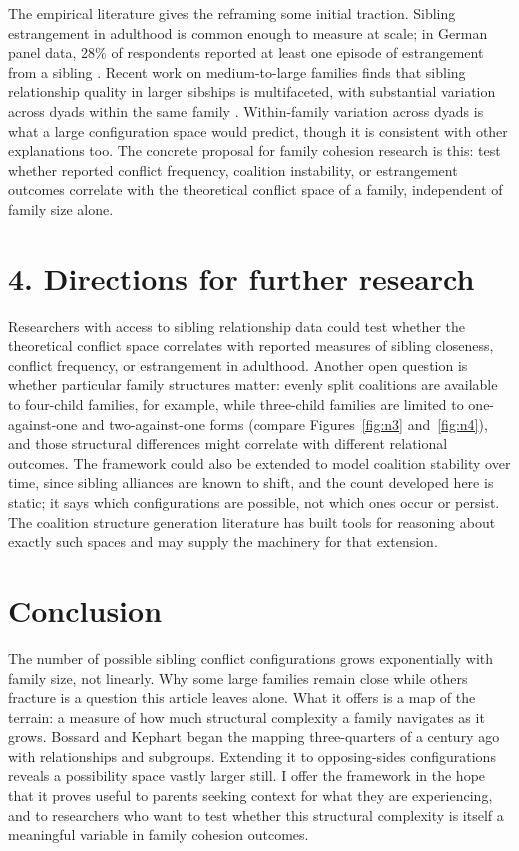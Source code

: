 \documentclass[11pt]{article}
\begin{document}
The empirical literature gives the reframing some initial traction. Sibling
estrangement in adulthood is common enough to measure at scale; in German panel data,
28\% of respondents reported at least one episode of estrangement from a sibling
\cite{hank2023}. Recent work on medium-to-large families finds that sibling
relationship quality in larger sibships is multifaceted, with substantial variation
across dyads within the same family \cite{jensen2026}. Within-family variation across
dyads is what a large configuration space would predict, though it is consistent with
other explanations too. The concrete proposal for family cohesion research is this:
test whether reported conflict frequency, coalition instability, or estrangement
outcomes correlate with the theoretical conflict space of a family, independent of
family size alone.

\section*{4. Directions for further research}

Researchers with access to sibling relationship data could test whether the
theoretical conflict space correlates with reported measures of sibling closeness,
conflict frequency, or estrangement in adulthood. Another open question is whether
particular family structures matter: evenly split coalitions are available to
four-child families, for example, while three-child families are limited to
one-against-one and two-against-one forms (compare Figures~\ref{fig:n3}
and~\ref{fig:n4}), and those structural differences might correlate with different
relational outcomes. The framework could also be extended to
model coalition stability over time, since sibling alliances are known to shift, and
the count developed here is static; it says which configurations are possible, not
which ones occur or persist. The coalition structure generation literature has built
tools for reasoning about exactly such spaces \cite{rahwan2015} and may supply the
machinery for that extension.

\section*{Conclusion}

The number of possible sibling conflict configurations grows exponentially with
family size, not linearly. Why some large families remain close while others fracture
is a question this article leaves alone. What it offers is a map of the terrain: a
measure of how much structural complexity a family navigates as it grows. Bossard and
Kephart began the mapping three-quarters of a century ago with relationships and
subgroups. Extending it to opposing-sides configurations reveals a possibility space
vastly larger still. I offer the framework in the hope that it proves useful to
parents seeking context for what they are experiencing, and to researchers who want
to test whether this structural complexity is itself a meaningful variable in family
cohesion outcomes.
\end{document}
